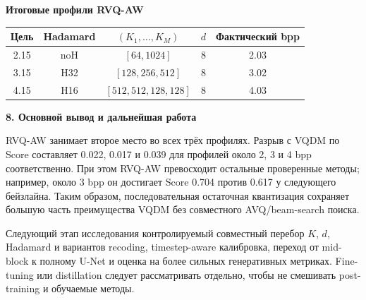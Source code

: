 \documentclass[11pt,a4paper]{article}
\newcommand{\sectiontitle}[1]{%
  \vspace{0.18cm}
  {\large\bfseries\color{msublue} #1}\par\vspace{0.08cm}
}
\newcommand{\subsectiontitle}[1]{%
  \vspace{0.10cm}
  {\normalsize\bfseries\color{msured} #1}\par\vspace{0.04cm}
}
\begin{document}
\subsectiontitle{Итоговые профили RVQ-AW}

\begin{center}
\begin{tabular}{c c c c c}
  \toprule
  Цель & Hadamard & $(K_1,\ldots,K_M)$ & $d$ & Фактический bpp \\
  \midrule
  2.15 & noH & $[64,1024]$ & 8 & 2.03 \\
  3.15 & H32 & $[128,256,512]$ & 8 & 3.02 \\
  4.15 & H16 & $[512,512,128,128]$ & 8 & 4.03 \\
  \bottomrule
\end{tabular}
\end{center}

\sectiontitle{8. Основной вывод и дальнейшая работа}

RVQ-AW занимает второе место во всех трёх профилях. Разрыв с VQDM по Score составляет 0.022, 0.017 и 0.039 для профилей около 2, 3 и 4 bpp соответственно. При этом RVQ-AW превосходит остальные проверенные методы; например, около 3 bpp он достигает Score 0.704 против 0.617 у следующего бейзлайна. Таким образом, последовательная остаточная квантизация сохраняет большую часть преимущества VQDM без совместного AVQ/beam-search поиска.

Следующий этап исследования \textemdash{} контролируемый совместный перебор $K$, $d$, Hadamard и вариантов recoding, timestep-aware калибровка, переход от mid-block к полному U-Net и оценка на более сильных генеративных метриках. Fine-tuning или distillation следует рассматривать отдельно, чтобы не смешивать post-training и обучаемые методы.
\end{document}

